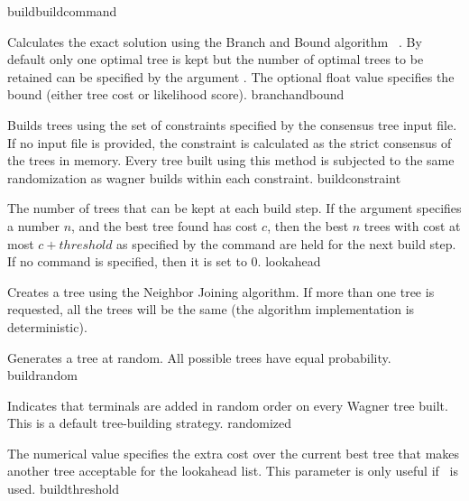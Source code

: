 \begin{command}{build}{buildcommand}
\begin{arguments}
            {Calculates the exact solution using the Branch and Bound algorithm
            ~\cite{hendy1982}. By default only one optimal tree is kept but
            the number of optimal trees to be retained can be specified by the
            argument . The optional float value specifies the
            bound (either tree cost or likelihood score).}
            {branchandbound} 

            {Builds trees using the set of constraints specified by the consensus
            tree input file. If no input file is provided, the constraint is calculated as
            the strict consensus of the trees in memory. Every tree built
            using this method is subjected to the same randomization as wagner
            builds within each constraint.}
            {buildconstraint}

            {The number of trees that can be kept at each build step. If the
             argument 
            specifies a number $n$, and the best tree found has cost $c$, then the best $n$
            trees with cost at most $c + threshold$ as specified by
            the  command are held for the
            next build step. If no  command is specified,
            then it is set to $0$.}
            {lookahead}

            {Creates a tree using the Neighbor Joining algorithm. If more than
            one tree is requested, all the trees will be the same (the algorithm
            implementation is deterministic).}{}

            {Generates a tree at random.  All possible trees have equal
            probability.}
            {buildrandom}

            {Indicates that terminals are added in random order on every Wagner
            tree built. This is a default tree-building strategy.}
            {randomized}

            {The numerical value specifies the extra cost over the current best
            tree that makes another tree acceptable for the lookahead list. This 
            parameter is only useful if~ is used.}
            {buildthreshold}
            

\end{arguments}
\end{command}
